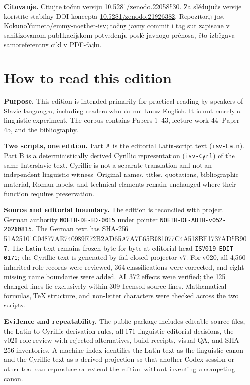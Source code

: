 \documentclass[11pt]{article}
\newcommand{\doiurl}[1]{\href{https://doi.org/#1}{#1}}
\newcommand{\repo}{\href{https://github.com/KokunoYumeto/emmy-noether-isv}{KokunoYumeto/emmy-noether-isv}}
\newcommand{\smallhash}[1]{{\ttfamily\footnotesize #1}}
\begin{document}
\textbf{Citovanje.} Citujte točnu versiju \doiurl{10.5281/zenodo.22058530}. Za slědujuče versije koristite stabilny DOI koncepta \doiurl{10.5281/zenodo.21926382}. Repozitorij jest \repo; točny javny commit i tag sut zapisane v sanitizovanom publikacijskom potvrđenju poslě javnogo prěnosa, čto izběgava samoreferentny cikl v PDF-fajlu.
\clearpage

\section*{How to read this edition}

\textbf{Purpose.} This edition is intended primarily for practical reading by speakers of Slavic languages, including readers who do not know English. It is not merely a linguistic experiment. The corpus contains Papers 1--43, lecture work 44, Paper 45, and the bibliography.

\textbf{Two scripts, one edition.} Part A is the editorial Latin-script text (\texttt{isv-Latn}). Part B is a deterministically derived Cyrillic representation (\texttt{isv-Cyrl}) of the same Interslavic text. Cyrillic is not a separate translation and not an independent linguistic witness. Original names, titles, quotations, bibliographic material, Roman labels, and technical elements remain unchanged where their function requires preservation.

\textbf{Source and editorial boundary.} The edition is reconciled with project German authority \texttt{NOETH-DE-ED-0015} under pointer \texttt{NOETH-DE-AUTH-v052-20260815}. The German text has SHA-256
\smallhash{51A25101C04877AE740989E72B2AD65A7A7E65B081077C4A518BF1737AD5B907}.
The Latin text remains frozen byte-for-byte at editorial head \texttt{ISV019-EDIT-0171}; the Cyrillic text is generated by fail-closed projector v7. For v020, all 4,560 inherited role records were reviewed, 364 classifications were corrected, and eight missing name boundaries were added. All 372 effects were verified; the 125 changed lines lie exclusively within 309 licensed source lines. Mathematical formulas, TeX structure, and non-letter characters were checked across the two scripts.

\textbf{Evidence and repeatability.} The public package includes editable source files, the Latin-to-Cyrillic derivation rules, all 171 linguistic editorial decisions, the v020 role review with rejected alternatives, build receipts, visual QA, and SHA-256 inventories. A machine index identifies the Latin text as the linguistic canon and the Cyrillic text as a derived projection so that another Codex session or other tool can reproduce or extend the edition without inventing a competing canon.
\end{document}

